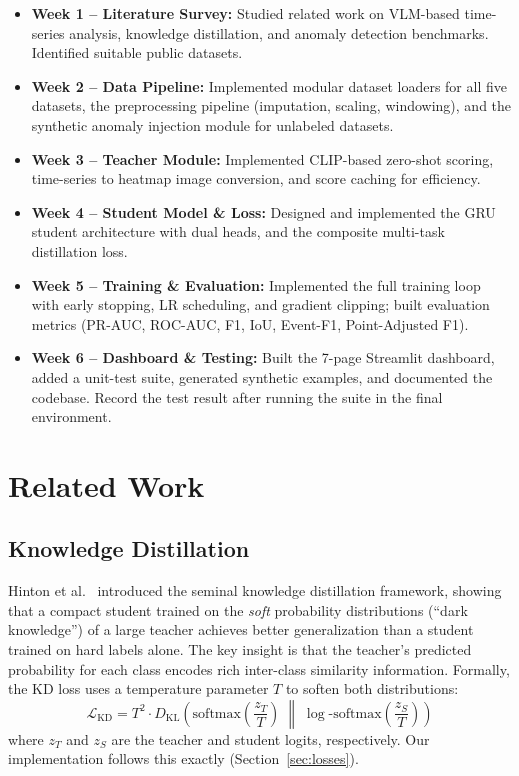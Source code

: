 \documentclass[10pt,twocolumn]{article}
\begin{document}
\begin{itemize}[leftmargin=*, topsep=2pt, itemsep=2pt]
    \item \textbf{Week 1 -- Literature Survey:} Studied related work on VLM-based time-series analysis, knowledge distillation, and anomaly detection benchmarks. Identified suitable public datasets.
    \item \textbf{Week 2 -- Data Pipeline:} Implemented modular dataset loaders for all five datasets, the preprocessing pipeline (imputation, scaling, windowing), and the synthetic anomaly injection module for unlabeled datasets.
    \item \textbf{Week 3 -- Teacher Module:} Implemented CLIP-based zero-shot scoring, time-series to heatmap image conversion, and score caching for efficiency.
    \item \textbf{Week 4 -- Student Model \& Loss:} Designed and implemented the GRU student architecture with dual heads, and the composite multi-task distillation loss.
    \item \textbf{Week 5 -- Training \& Evaluation:} Implemented the full training loop with early stopping, LR scheduling, and gradient clipping; built evaluation metrics (PR-AUC, ROC-AUC, F1, IoU, Event-F1, Point-Adjusted F1).
    \item \textbf{Week 6 -- Dashboard \& Testing:} Built the 7-page Streamlit dashboard, added a unit-test suite, generated synthetic examples, and documented the codebase. Record the test result after running the suite in the final environment.
\end{itemize}

\section{Related Work}

\subsection{Knowledge Distillation}
Hinton et al.~\cite{hinton2015distilling} introduced the seminal knowledge distillation framework, showing that a compact student trained on the \emph{soft} probability distributions (``dark knowledge'') of a large teacher achieves better generalization than a student trained on hard labels alone. The key insight is that the teacher's predicted probability for each class encodes rich inter-class similarity information. Formally, the KD loss uses a temperature parameter $T$ to soften both distributions:
\[
\mathcal{L}_{\text{KD}} = T^2 \cdot D_{\text{KL}}\!\left(\text{softmax}\!\left(\frac{z_T}{T}\right) \;\middle\|\; \log\text{-softmax}\!\left(\frac{z_S}{T}\right)\right)
\]
where $z_T$ and $z_S$ are the teacher and student logits, respectively. Our implementation follows this exactly (Section~\ref{sec:losses}).
\end{document}
